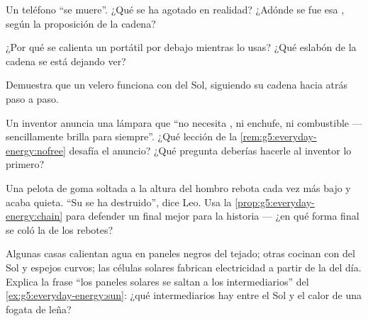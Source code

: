 \begin{exercise}[$\star$]\label{exo:g5:everyday-energy:6}
Un teléfono ``se muere''. ¿Qué se ha agotado en realidad? ¿Adónde se
fue esa , según la proposición de la cadena?
\end{exercise}

\begin{exercise}[$\star$]\label{exo:g5:everyday-energy:7}
¿Por qué se calienta un portátil por debajo mientras lo usas? ¿Qué
eslabón de la cadena se está dejando ver?
\end{exercise}

\begin{exercise}[$\star$]\label{exo:g5:everyday-energy:8}
Demuestra que un velero funciona con  del Sol, siguiendo su cadena
hacia atrás paso a paso.
\end{exercise}

\begin{exercise}[$\star\star$]\label{exo:g5:everyday-energy:9}
Un inventor anuncia una lámpara que ``no necesita , ni enchufe,
ni combustible --- sencillamente brilla para siempre''. ¿Qué lección
de la \cref{rem:g5:everyday-energy:nofree} desafía el anuncio? ¿Qué
pregunta deberías hacerle al inventor lo primero?
\end{exercise}

\begin{exercise}[$\star\star$]\label{exo:g5:everyday-energy:10}
Una pelota de goma soltada a la altura del hombro rebota cada vez más
bajo y acaba quieta. ``Su  se ha destruido'', dice Leo. Usa la
\cref{prop:g5:everyday-energy:chain} para defender un final mejor para
la historia --- ¿en qué forma final se coló la  de los
rebotes?
\end{exercise}

\begin{exercise}[$\star\star$]\label{exo:g5:everyday-energy:11}
Algunas casas calientan agua en paneles negros del tejado; otras
cocinan con  del Sol y espejos curvos; las células solares fabrican
electricidad a partir de la  del día. Explica la frase ``los
paneles solares se saltan a los intermediarios'' del
\cref{ex:g5:everyday-energy:sun}: ¿qué intermediarios hay entre el Sol
y el calor de una fogata de leña?
\end{exercise}
